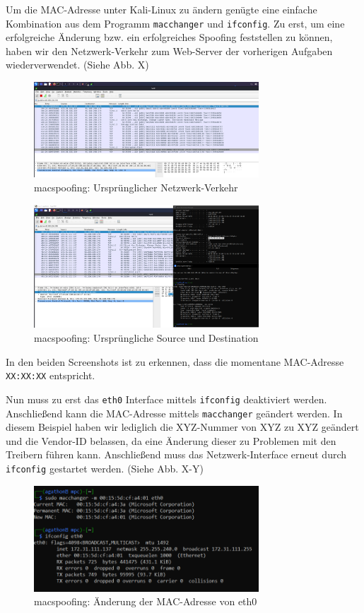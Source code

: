 \documentclass{article}
\begin{document}
Um die MAC-Adresse unter Kali-Linux zu ändern genügte eine einfache Kombination aus dem 
Programm \texttt{macchanger} und \texttt{ifconfig}. Zu erst, um eine erfolgreiche Änderung 
bzw. ein erfolgreiches Spoofing feststellen zu können, haben wir den Netzwerk-Verkehr zum 
Web-Server der vorherigen Aufgaben wiederverwendet. (Siehe Abb. X)

\begin{figure}[H]
	\includegraphics[width=0.75\textwidth]{images/08}
	\centering
	\caption{macspoofing: Ursprünglicher Netzwerk-Verkehr}
\end{figure}

\begin{figure}[H]
	\includegraphics[width=0.75\textwidth]{images/09}
	\centering
	\caption{macspoofing: Ursprüngliche Source und Destination}
\end{figure}

In den beiden Screenshots ist zu erkennen, dass die momentane MAC-Adresse 
\texttt{XX:XX:XX} entspricht.

Nun muss zu erst das \texttt{eth0} Interface mittels \texttt{ifconfig} deaktiviert werden. 
Anschließend kann die MAC-Adresse mittels \texttt{macchanger} geändert werden. In diesem 
Beispiel haben wir lediglich die XYZ-Nummer von XYZ zu XYZ geändert und die Vendor-ID 
belassen, da eine Änderung dieser zu Problemen mit den Treibern führen kann.
Anschließend muss das Netzwerk-Interface erneut durch \texttt{ifconfig} gestartet werden.
(Siehe Abb. X-Y)

\begin{figure}[H]
	\includegraphics[width=0.75\textwidth]{images/10}
	\centering
	\caption{macspoofing: Änderung der MAC-Adresse von eth0}
\end{figure}
\end{document}
